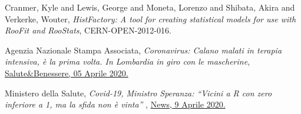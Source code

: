 \documentclass{article}
\begin{document}
\begin{thebibliography}{9}
Cranmer, Kyle and Lewis, George and Moneta, Lorenzo and Shibata, Akira and Verkerke, Wouter,
\textit{ 
HistFactory: A tool for creating statistical models for use with RooFit and RooStats},
CERN-OPEN-2012-016.

Agenzia Nazionale Stampa Associata, 
\textit{Coronavirus: Calano malati in terapia intensiva, è la prima volta. In Lombardia in giro con le mascherine},
\href{https://www.ansa.it/canale_saluteebenessere/notizie/sanita/2020/04/04/coronavirus-_29e301b7-fd53-405c-9e5d-92f907057932.html}{Salute\&Benessere, 05 Aprile 2020.}

Ministero della Salute, \textit{Covid-19, Ministro Speranza: ``Vicini a R con zero inferiore a 1, ma la sfida non è vinta'' },
\href{http://www.salute.gov.it/portale/news/p3_2_1_1_1.jsp?lingua=italiano&menu=notizie&p=dalministero&id=4429}{News, 9 Aprile 2020.}

\end{thebibliography}


\newpage
\begin{appendices}

\end{appendices}
\end{document}
